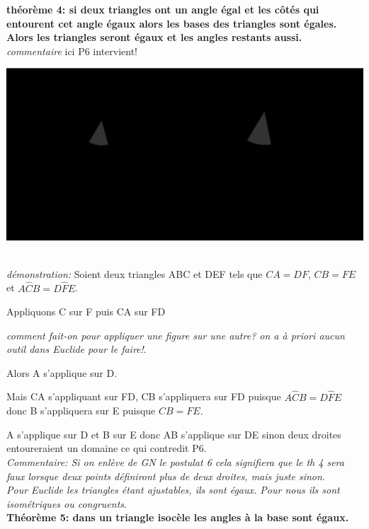 \documentclass[a4paper, 12pt, twoside]{book}
\begin{document}
\textbf{théorème 4: si deux triangles ont un angle égal et les côtés qui entourent cet angle égaux alors les bases des triangles sont égales. Alors les triangles seront égaux et les angles restants aussi.}\\

\textit{commentaire} ici P6 intervient! 
 

 
 
  \includegraphics[scale=0.5]{figures/LIVRE1&4.eps} \
  
 \textit{démonstration:} Soient deux triangles ABC et DEF tels que $CA=DF$, $CB=FE$ et $A\hat{C}B=D\hat{F}E$.\
 
 Appliquons C sur F puis CA sur FD\
 
 \textit{comment fait-on pour appliquer une figure sur une autre? on a à priori aucun outil dans Euclide pour le faire!}.\
 
  Alors A s'applique sur D. \
 
 Mais CA s'appliquant sur FD, CB s'appliquera sur FD puisque $A\hat{C}B=D\hat{F}E$ donc B s'appliquera sur E puisque $CB=FE$.\
 
 A s'applique sur D et B sur E donc AB s'applique sur DE sinon deux droites entoureraient un domaine ce qui contredit P6.\\
 
 \textit{Commentaire: Si on enlève de GN le postulat 6 cela signifiera que le th 4 sera faux lorsque deux points définiront plus de deux droites, mais juste sinon}.\\
 
 \textit{Pour Euclide les triangles étant ajustables, ils sont égaux. Pour nous ils sont isométriques ou congruents}.\\
  
 \textbf{Théorème 5: dans un triangle isocèle les angles à la base sont égaux.}\\
 
\end{document}
